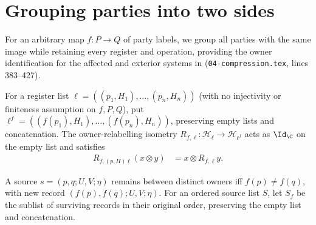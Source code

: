 \section{Grouping parties into two sides}
\label{sec:peps_party_coarsening}

For an arbitrary map $f:P\to Q$ of party labels, we group all parties with
the same image while retaining every register and operation, providing the
owner identification for the affected and exterior systems in
\cite[proof of Theorem~5.2]{OpenAI2026PolynomialPEPS}
(\texttt{04-compression.tex}, lines 383--427).


\begin{definition}
    \label{def:peps_owner_layout}
    \leanok
    For a register list $\ell=((p_1,H_1),\ldots,(p_n,H_n))$ (with no
    injectivity or finiteness assumption on $f,P,Q$), put
    $\ell^f=((f(p_1),H_1),\ldots,(f(p_n),H_n))$, preserving empty lists and
    concatenation. The owner-relabelling isometry
    $R_{f,\ell}:\mathcal H_\ell\to\mathcal H_{\ell^f}$ acts as $\Id_{\C}$ on the
    empty list and satisfies
    \begin{align}
        R_{f,(p,H)\ell}(x\otimes y)
         & =x\otimes R_{f,\ell}y.
        \label{eq:peps_owner_head}
    \end{align}
\end{definition}

\begin{definition}
    \label{def:peps_owner_sources}
    \leanok
    A source $s=(p,q;U,V;\eta)$ remains between distinct owners iff
    $f(p)\ne f(q)$, with new record $(f(p),f(q);U,V;\eta)$. For an ordered
    source list $S$, let $S_f$ be the sublist of surviving records in their
    original order, preserving the empty list and concatenation.
\end{definition}

